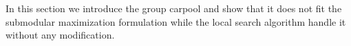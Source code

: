 In this section we introduce the group carpool and show that it does not fit the
submodular maximization formulation while the local search algorithm handle it
without any modification.
